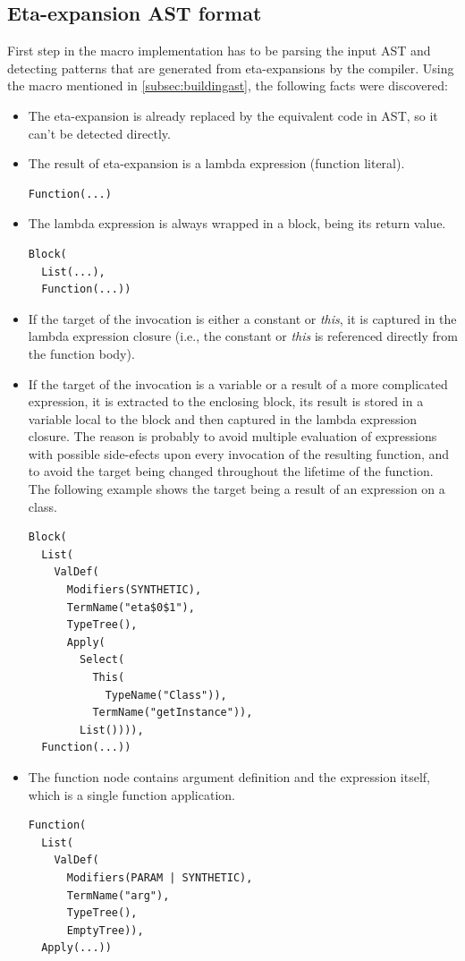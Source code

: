 \subsection{Eta-expansion AST format}

First step in the macro implementation has to be parsing the input AST and detecting patterns that are generated from eta-expansions by the compiler. Using the  macro mentioned in \ref{subsec:buildingast}, the following facts were discovered:

\begin{itemize}
	\item The eta-expansion is already replaced by the equivalent code in AST, so it can't be detected directly.
	\item The result of eta-expansion is a lambda expression (function literal).
\lstset{style=Dump}
\begin{lstlisting}
Function(...)
\end{lstlisting}
	\item The lambda expression is always wrapped in a block, being its return value.
	
\lstset{style=Dump}
\begin{lstlisting}
Block(
  List(...), 
  Function(...))
\end{lstlisting}	
	
	\item If the target of the invocation is either a constant or \textit{this}, it is captured in the lambda expression closure (i.e., the constant or \textit{this} is referenced directly from the function body).
	
	\item If the target of the invocation is a variable or a result of a more complicated expression, it is extracted to the enclosing block, its result is stored in a variable local to the block and then captured in the lambda expression closure. The reason is probably to avoid multiple evaluation of expressions with possible side-efects upon every invocation of the resulting function, and to avoid the target being changed throughout the lifetime of the function. The following example shows the target being a result of an expression  on a  class.
	
\lstset{style=Dump}
\begin{lstlisting}
Block(
  List(
    ValDef(
      Modifiers(SYNTHETIC), 
      TermName("eta$0$1"), 
      TypeTree(), 
      Apply(
        Select(
          This(
            TypeName("Class")), 
          TermName("getInstance")), 
        List()))), 
  Function(...))
\end{lstlisting}

	\item The function node contains argument definition and the expression itself, which is a single function application.

\lstset{style=Dump}
\begin{lstlisting}
Function(
  List(
    ValDef(
      Modifiers(PARAM | SYNTHETIC), 
      TermName("arg"), 
      TypeTree(), 
      EmptyTree)), 
  Apply(...))
\end{lstlisting}
\end{itemize}

